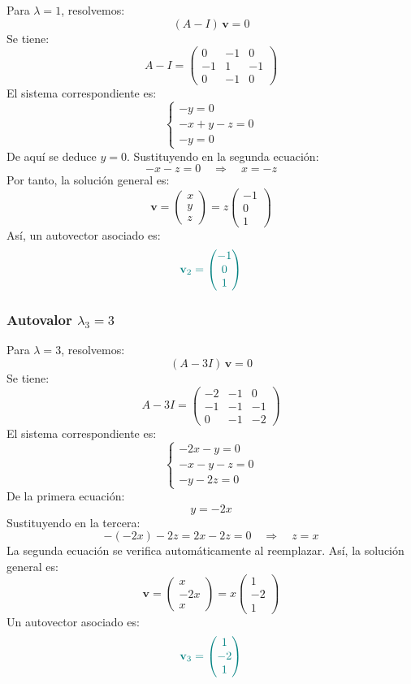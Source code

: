 \documentclass{article}
\begin{document}
\begin{enumerate}[label=\textbf{\alph*)}]
Para \(\lambda = 1\), resolvemos:
\[
(A - I)\,\mathbf{v} = 0
\]
Se tiene:
\[
A - I =
\begin{pmatrix}
0 & -1 & 0\\
-1 & 1 & -1\\
0 & -1 & 0
\end{pmatrix}
\]
El sistema correspondiente es:
\[
\begin{cases}
- y = 0\\[2mm]
- x + y - z = 0\\[2mm]
- y = 0
\end{cases}
\]
De aquí se deduce \(y = 0\).  
Sustituyendo en la segunda ecuación:
\[
- x - z = 0
\quad\Longrightarrow\quad
x = -z
\]
Por tanto, la solución general es:
\[
\mathbf{v} =
\begin{pmatrix}
x\\
y\\
z
\end{pmatrix}
=
z\begin{pmatrix}
-1\\
0\\
1
\end{pmatrix}
\]
Así, un autovector asociado es:
\[
\color{teal}
\mathbf{v}_2 =
\begin{pmatrix}
-1\\
0\\
1
\end{pmatrix}
\]

\subsubsection*{Autovalor \(\lambda_3 = 3\)}

Para \(\lambda = 3\), resolvemos:
\[
(A - 3I)\,\mathbf{v} = 0
\]
Se tiene:
\[
A - 3I =
\begin{pmatrix}
-2 & -1 & 0\\
-1 & -1 & -1\\
0 & -1 & -2
\end{pmatrix}
\]
El sistema correspondiente es:
\[
\begin{cases}
-2x - y = 0\\[2mm]
- x - y - z = 0\\[2mm]
- y - 2z = 0
\end{cases}
\]
De la primera ecuación:
\[
y = -2x
\]
Sustituyendo en la tercera:
\[
-(-2x) - 2z = 2x - 2z = 0
\quad\Longrightarrow\quad
z = x
\]
La segunda ecuación se verifica automáticamente al reemplazar.  
Así, la solución general es:
\[
\mathbf{v} =
\begin{pmatrix}
x\\
-2x\\
x
\end{pmatrix}
=
x\begin{pmatrix}
1\\
-2\\
1
\end{pmatrix}
\]
Un autovector asociado es:
\[
\color{teal}
\mathbf{v}_3 =
\begin{pmatrix}
1\\
-2\\
1
\end{pmatrix}
\]

\end{enumerate}
\end{document}
